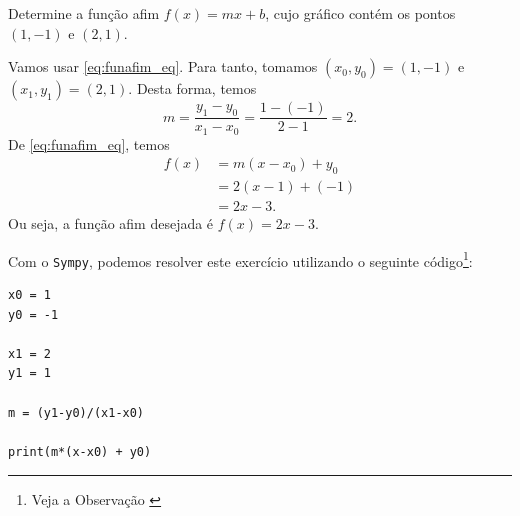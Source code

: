 \begin{exeresol}
  Determine a função afim $f(x) = mx + b$, cujo gráfico contém os pontos $(1, -1)$ e $(2, 1)$.
\end{exeresol}
\begin{resol}
  Vamos usar \eqref{eq:funafim_eq}. Para tanto, tomamos $(x_0, y_0) = (1, -1)$ e $(x_1, y_1) = (2, 1)$. Desta forma, temos
  \begin{equation}
    m = \frac{y_1 - y_0}{x_1 - x_0} = \frac{1 - (-1)}{2 - 1} = 2.
  \end{equation}
  De \eqref{eq:funafim_eq}, temos
  \begin{align}
    f(x) &= m(x-x_0) + y_0\\
         &= 2(x - 1) + (-1) \\
         &= 2x -3.
  \end{align}
  Ou seja, a função afim desejada é $f(x) = 2x - 3$.

  \ifispython
  Com o \verb+Sympy+, podemos resolver este exercício utilizando o seguinte código\footnote{Veja a Observação \label{obs:cap_funafom_python}}:
\begin{verbatim}
x0 = 1
y0 = -1

x1 = 2
y1 = 1

m = (y1-y0)/(x1-x0)

print(m*(x-x0) + y0)
\end{verbatim}
  \fi
\end{resol}


